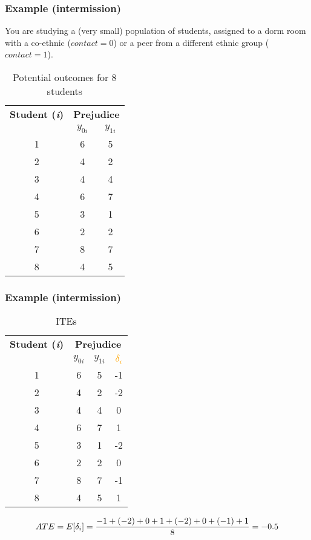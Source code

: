 \documentclass[12pt,english,dvipsnames,aspectratio=169,handout]{beamer}\usepackage[]{graphicx}\usepackage[]{xcolor}
\begin{document}
\begin{frame}
  \frametitle{Example (intermission)}
  
  You are studying a (very small) population of students, assigned to a dorm room with a co-ethnic ($contact=0$) or a peer from a different ethnic group ($contact=1$).
  
  \begin{table}[!ht]
  \centering
  \scriptsize
  \begin{tabular}{c c c}
  \toprule
  \textbf{Student (\textit{i})} & \multicolumn{2}{c}{\textbf{Prejudice}} \\
  & $y_{0i}$ & $y_{1i}$ \\
  \midrule
  1 & 6 & 5 \\
  2 & 4 & 2 \\
  3 & 4 & 4 \\
  4 & 6 & 7 \\
  5 & 3 & 1 \\
  6 & 2 & 2 \\
  7 & 8 & 7 \\
  8 & 4 & 5 \\
  \bottomrule
  \end{tabular}
  \label{tab:02}
  \caption{Potential outcomes for 8 students}
  \end{table}



\end{frame}


\begin{frame}
  \frametitle{Example (intermission)}
  
  \begin{table}[!ht]
  \centering
  \scriptsize
  \begin{tabular}{c c c c}
  \toprule
  \textbf{Student (\textit{i})} & \multicolumn{3}{c}{\textbf{Prejudice}} \\
  & $y_{0i}$ & $y_{1i}$ & \textcolor{orange}{$\delta_i$} \\
  \midrule
  1 & 6 & 5 & -1 \\
  2 & 4 & 2 & -2 \\
  3 & 4 & 4 & 0 \\
  4 & 6 & 7 & 1 \\
  5 & 3 & 1 & -2 \\
  6 & 2 & 2 & 0 \\
  7 & 8 & 7 & -1 \\
  8 & 4 & 5 & 1 \\
  \bottomrule
  \end{tabular}
  \label{tab:03}
  \caption{ITEs}
  \end{table}
  
  \begin{equation}
  \footnotesize
  ATE = E[\delta_i] = \frac{-1+(-2)+0+1+(-2)+0+(-1)+1}{8} = -0.5
    \label{eq:05}
  \end{equation}
  
\end{frame}
\end{document}
